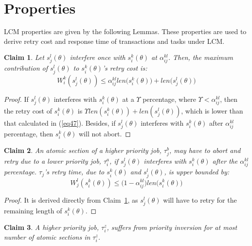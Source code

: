 \documentclass[12pt,english]{report}
\newtheorem{clm}{Claim}
\newtheorem{proof}{Proof}
\begin{document}
\section{Properties}\label{sec:lcm_properties}

LCM properties are given by the following Lemmas. These properties are used to derive retry cost and response time of transactions and tasks under LCM.

\begin{clm}
\label{LCM_higher_rc}
Let $s_{j}^{l}(\theta)$ interfere once with $s_{i}^{k}(\theta)$ at $\alpha_{ij}^{kl}$. Then, the maximum contribution of $s_{j}^{l}(\theta)$ to 
$s_{i}^{k}(\theta)$'s 
retry cost is:
\begin{equation}
W_i^k(s_j^l(\theta))\le \alpha_{ij}^{kl}len\Big(s_{i}^{k}(\theta)\Big)+len\Big(s_{j}^{l}(\theta)\Big)\label{eq47}\end{equation}
\end{clm}

\begin{proof}\normalfont
If $s_{j}^{l}(\theta)$ interferes with $s_{i}^{k}(\theta)$
at a $\Upsilon$ percentage, where $\Upsilon<\alpha_{ij}^{kl}$,
then the retry cost of $s_{i}^{k}(\theta)$ is $\Upsilon len(s_{i}^{k}(\theta))+len(s_{j}^{l}(\theta))$, which is lower than that calculated in (\ref{eq47}). Besides, 
if $s_{j}^{l}(\theta)$ interferes with $s_{i}^{k}(\theta)$ after
$\alpha_{ij}^{kl}$ percentage, then $s_{i}^{k}(\theta)$ will not
abort.
\end{proof}


\begin{clm}
\label{LCM_lower_rc}
An atomic section of a higher priority job, $\tau_{j}^b$, may have to abort and retry due to a lower priority job, $\tau_{i}^a$, if $s_{j}^{l}(\theta)$ interferes
with $s_{i}^{k}(\theta)$ after the $\alpha_{ij}^{kl}$ percentage. $\tau_{j}$'s retry time, due to $s_{i}^{k}(\theta)$ and $s_{j}^{l}(\theta)$,
is upper bounded by:
 \begin{equation}
W_j^l(s_i^k(\theta))\le \Big(1-\alpha_{ij}^{kl}\Big)len\Big(s_{i}^{k}(\theta)\Big)\label{eq48}\end{equation}
\end{clm}

\begin{proof}\normalfont
It is derived directly from Claim~\ref{LCM_higher_rc}, as $s_j^l(\theta)$ will have to retry for the remaining length of $s_i^k(\theta)$.
\end{proof}

\begin{clm}
\label{no priority inversion in lcm}
A higher priority job, $\tau_i^z$, suffers from priority inversion for at most number of atomic sections in $\tau_i^z$.
\end{clm}
\end{document}
